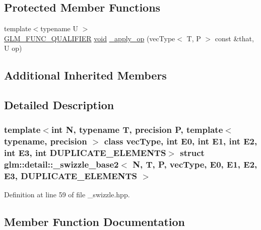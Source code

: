 \subsection*{Protected Member Functions}
\begin{DoxyCompactItemize}
\item 
{\footnotesize template$<$typename U $>$ }\\\mbox{\hyperlink{setup_8hpp_a33fdea6f91c5f834105f7415e2a64407}{G\+L\+M\+\_\+\+F\+U\+N\+C\+\_\+\+Q\+U\+A\+L\+I\+F\+I\+ER}} \mbox{\hyperlink{glad_8h_a950fc91edb4504f62f1c577bf4727c29}{void}} \mbox{\hyperlink{structglm_1_1detail_1_1__swizzle__base2_a2ce452e18ec0b5f12befd12cb5619686}{\+\_\+apply\+\_\+op}} (vec\+Type$<$ T, P $>$ const \&that, U op)
\end{DoxyCompactItemize}
\subsection*{Additional Inherited Members}


\subsection{Detailed Description}
\subsubsection*{template$<$int N, typename T, precision P, template$<$ typename, precision $>$ class vec\+Type, int E0, int E1, int E2, int E3, int D\+U\+P\+L\+I\+C\+A\+T\+E\+\_\+\+E\+L\+E\+M\+E\+N\+TS$>$\newline
struct glm\+::detail\+::\+\_\+swizzle\+\_\+base2$<$ N, T, P, vec\+Type, E0, E1, E2, E3, D\+U\+P\+L\+I\+C\+A\+T\+E\+\_\+\+E\+L\+E\+M\+E\+N\+T\+S $>$}



Definition at line 59 of file \+\_\+swizzle.\+hpp.



\subsection{Member Function Documentation}
\mbox{\label{structglm_1_1detail_1_1__swizzle__base2_a2ce452e18ec0b5f12befd12cb5619686}} 
